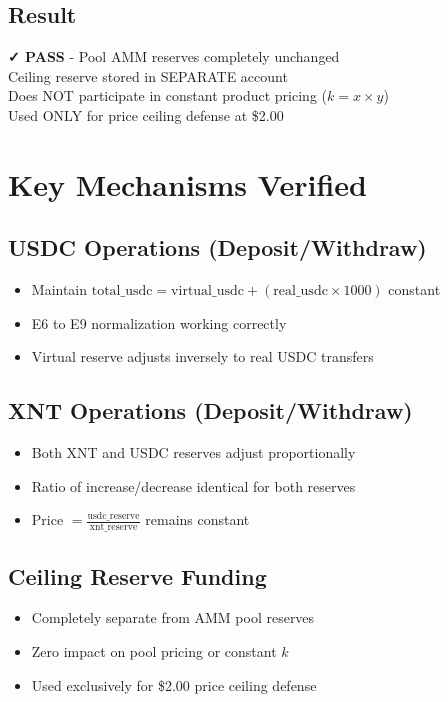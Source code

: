 \documentclass[11pt,a4paper]{article}
\begin{document}
\subsection{Result}
\begin{tcolorbox}[colback=success!10,colframe=success]
\textbf{✓ PASS} - Pool AMM reserves completely unchanged\\
Ceiling reserve stored in SEPARATE account\\
Does NOT participate in constant product pricing ($k = x \times y$)\\
Used ONLY for price ceiling defense at \$2.00
\end{tcolorbox}

\newpage

\section{Key Mechanisms Verified}

\subsection{USDC Operations (Deposit/Withdraw)}
\begin{itemize}
    \item Maintain $\text{total\_usdc} = \text{virtual\_usdc} + (\text{real\_usdc} \times 1000)$ constant
    \item E6 to E9 normalization working correctly
    \item Virtual reserve adjusts inversely to real USDC transfers
\end{itemize}

\subsection{XNT Operations (Deposit/Withdraw)}
\begin{itemize}
    \item Both XNT and USDC reserves adjust proportionally
    \item Ratio of increase/decrease identical for both reserves
    \item Price $= \frac{\text{usdc\_reserve}}{\text{xnt\_reserve}}$ remains constant
\end{itemize}

\subsection{Ceiling Reserve Funding}
\begin{itemize}
    \item Completely separate from AMM pool reserves
    \item Zero impact on pool pricing or constant $k$
    \item Used exclusively for \$2.00 price ceiling defense
\end{itemize}
\end{document}
